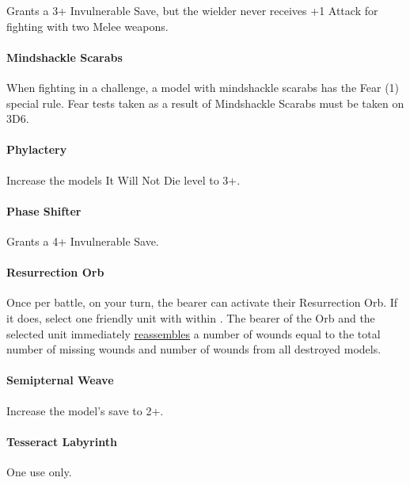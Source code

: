 Grants a 3+ Invulnerable Save, but the wielder never receives +1 Attack for fighting with two Melee weapons.

\paragraph*{Mindshackle Scarabs} \label{Mindshackle Scarabs}

When fighting in a challenge, a model with mindshackle scarabs has the Fear (1) special rule. Fear tests taken as a result of Mindshackle Scarabs must be taken on 3D6. 

\paragraph*{Phylactery} \label{Phylactery}

Increase the models It Will Not Die level to 3+.

\paragraph*{Phase Shifter} \label{Phase Shifter}

Grants a 4+ Invulnerable Save.

\paragraph*{Resurrection Orb} \label{Resurrection Orb}

Once per battle, on your turn, the bearer can activate their Resurrection Orb. If it does, select one friendly unit with  within . The bearer of the Orb and the selected unit immediately \textcolor{violet}{\hyperref[Reanimation Protocols]{reassembles}} a number of wounds equal to the total number of missing wounds and number of wounds from all destroyed models.

\paragraph*{Semipternal Weave} \label{Sempiternal Weave}

Increase the model's save to 2+.

\paragraph*{Tesseract Labyrinth} \label{Tesseract Labyrinth}

One use only.

